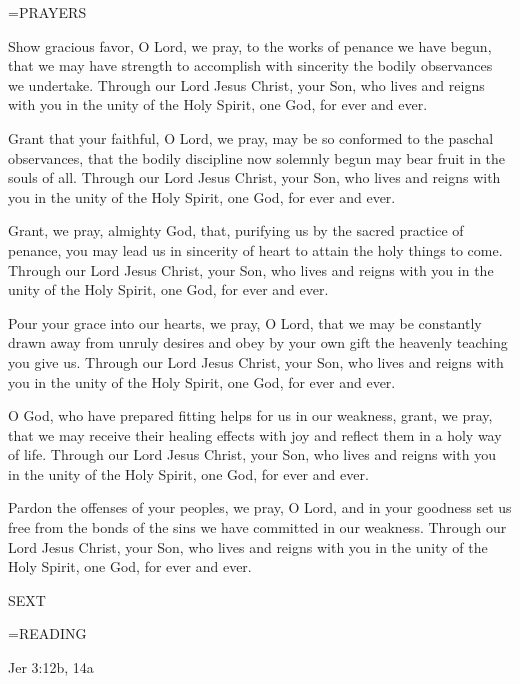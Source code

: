 \hangindent=\parindent \small PRAYERS
\begin{description}[labelindent=\parindent, leftmargin=*]
\item [Friday after Ash Wednesday:] 	Show gracious favor, O Lord, we pray, to the works of penance we have begun, that we may have strength to accomplish with sincerity the bodily observances we undertake. Through our Lord Jesus Christ, your Son, who lives and reigns with you in the unity of the Holy Spirit, one God, for ever and ever.
\item [Week 1:] 	Grant that your faithful, O Lord, we pray, may be so conformed to the paschal observances, that the bodily discipline now solemnly begun may bear fruit in the souls of all. Through our Lord Jesus Christ, your Son, who lives and reigns with you in the unity of the Holy Spirit, one God, for ever and ever.
\item [Week 2:] 	Grant, we pray, almighty God, that, purifying us by the sacred practice of penance, you may lead us in sincerity of heart to attain the holy things to come. Through our Lord Jesus Christ, your Son, who lives and reigns with you in the unity of the Holy Spirit, one God, for ever and ever.
\item [Week 3:] 	Pour your grace into our hearts, we pray, O Lord, that we may be constantly drawn away from unruly desires and obey by your own gift the heavenly teaching you give us. Through our Lord Jesus Christ, your Son, who lives and reigns with you in the unity of the Holy Spirit, one God, for ever and ever.
\item [Week 4:] 	O God, who have prepared fitting helps for us in our weakness, grant, we pray, that we may receive their healing effects with joy and reflect them in a holy way of life. Through our Lord Jesus Christ, your Son, who lives and reigns with you in the unity of the Holy Spirit, one God, for ever and ever.
\item [Week 5:] 	Pardon the offenses of your peoples, we pray, O Lord, and in your goodness set us free from the bonds of the sins we have committed in our weakness. Through our Lord Jesus Christ, your Son, who lives and reigns with you in the unity of the Holy Spirit, one God, for ever and ever.
\end{description}

\begin{flushleft}\normalsize SEXT\\\end{flushleft}
\hangindent=\parindent \small READING
\begin{description}[labelindent=\parindent, leftmargin=*]
\item [Friday after Ash Wednesday \& Weeks 1-4:]     Jer 3:12b, 14a \textbf{    \\}
\end{description}

